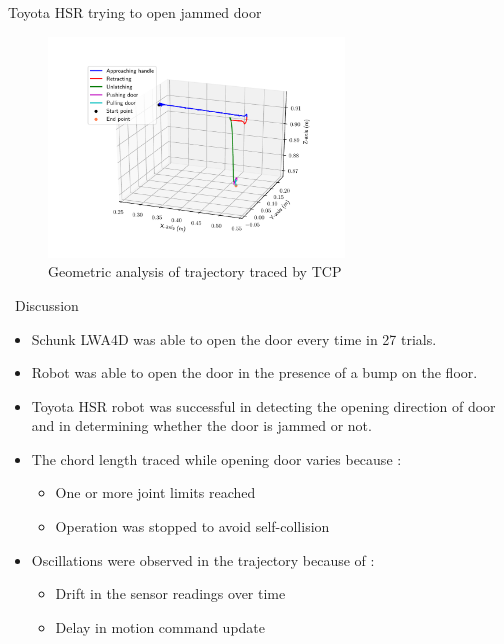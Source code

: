 \documentclass[aspectratio=169]{beamer}
\begin{document}
\begin{frame}
	Toyota HSR trying to open jammed door
	\vspace{-0.3cm}
	\begin{figure}[t]
		\centering
		\includegraphics[width=0.7\textwidth]{images/exp/8776_traj.pdf}
			\vspace{-0.3cm}
		\caption{Geometric analysis of trajectory traced by TCP}
		
	\end{figure}
\end{frame}


\begin{frame}{~}{Discussion}
	\begin{itemize}
		
		\item Schunk LWA4D was able to open the door every time in 27 trials.
		\item Robot was able to open the door in the presence of a bump on the floor.
		\item Toyota HSR robot was successful in detecting the opening direction of door and in determining whether the door is jammed or not.
		
		\item The chord length traced while opening door varies because :
		\begin{itemize}
			\item One or more joint limits reached
			\item Operation was stopped to avoid self-collision
		\end{itemize}
		\item Oscillations were observed in the trajectory because of :
		\begin{itemize}
			\item Drift in the sensor readings over time
			\item Delay in motion command update
		\end{itemize}
		
	\end{itemize}
\end{frame}
\end{document}
